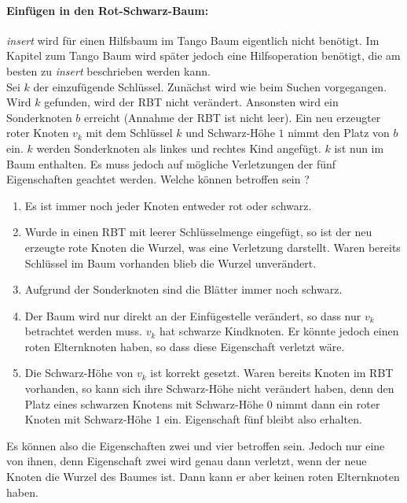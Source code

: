 \documentclass[a4paper,12pt]{article}
\begin{document}
\paragraph{Einfügen in den Rot-Schwarz-Baum:}
\textit{insert} wird für einen Hilfsbaum im Tango Baum eigentlich nicht benötigt. Im Kapitel zum Tango Baum wird später jedoch eine Hilfsoperation benötigt, die am besten zu \textit{insert} beschrieben werden kann.\\
Sei $k$ der einzufügende Schlüssel. Zunächst wird wie beim Suchen vorgegangen. Wird $k$ gefunden, wird der RBT nicht verändert. Ansonsten wird ein Sonderknoten $b$ erreicht (Annahme der RBT ist nicht leer). Ein neu erzeugter roter Knoten $v_k$ mit dem Schlüssel $k$ und Schwarz-Höhe $1$ nimmt den Platz von $b$ ein. $k$ werden Sonderknoten als linkes und rechtes Kind angefügt. $k$ ist nun im Baum enthalten. Es muss jedoch auf mögliche Verletzungen der fünf Eigenschaften geachtet werden. Welche können betroffen sein ?

\begin{enumerate}
	\item Es ist immer noch jeder Knoten entweder rot oder schwarz.
	\item Wurde in einen RBT mit leerer Schlüsselmenge eingefügt, so ist der neu erzeugte rote Knoten die Wurzel, was eine Verletzung darstellt. Waren bereits Schlüssel im Baum vorhanden blieb die Wurzel unverändert.
	\item Aufgrund der Sonderknoten sind die Blätter immer noch schwarz.
	\item Der Baum wird nur direkt an der Einfügestelle verändert, so dass nur $v_k$ betrachtet werden muss. $v_k$ hat schwarze Kindknoten. Er könnte jedoch einen roten Elternknoten haben, so dass diese Eigenschaft verletzt wäre.
	\item Die Schwarz-Höhe von $v_k$ ist korrekt gesetzt. Waren bereits Knoten im RBT vorhanden, so kann sich ihre Schwarz-Höhe nicht verändert haben, denn den Platz eines schwarzen Knotens mit Schwarz-Höhe $0$ nimmt dann ein roter Knoten mit Schwarz-Höhe $1$ ein. Eigenschaft fünf bleibt also erhalten. 
\end{enumerate}  

\noindent Es können also die Eigenschaften zwei und vier betroffen sein. Jedoch nur eine von ihnen, denn Eigenschaft zwei wird genau dann verletzt, wenn der neue Knoten die Wurzel des Baumes ist. Dann kann er aber keinen roten Elternknoten haben.
\end{document}

